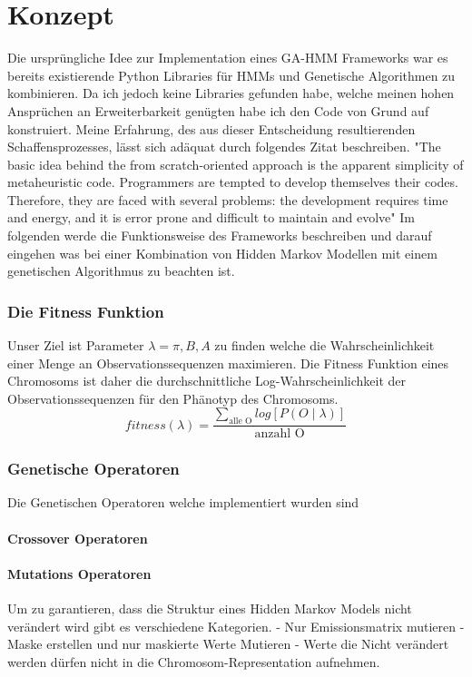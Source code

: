 \chapter{Konzept}
Die ursprüngliche Idee zur Implementation eines GA-HMM Frameworks war es bereits existierende Python Libraries für HMMs und Genetische Algorithmen zu kombinieren. Da ich jedoch keine Libraries gefunden habe, welche meinen hohen Ansprüchen an Erweiterbarkeit genügten habe ich den Code von Grund auf konstruiert. Meine Erfahrung, des aus dieser Entscheidung resultierenden Schaffensprozesses, lässt sich adäquat durch folgendes Zitat beschreiben.
"The basic idea behind the from scratch-oriented approach is the apparent simplicity of metaheuristic code. Programmers are tempted to develop themselves their codes. Therefore, they are faced with several problems: the development requires time and energy, and it is error prone and difficult to maintain and evolve" \cite*{MetaheuristicsEGT}
Im folgenden werde die Funktionsweise des Frameworks beschreiben und darauf eingehen was bei einer Kombination von Hidden Markov Modellen mit einem genetischen Algorithmus zu beachten ist.

\subsection*{Die Fitness Funktion}
Unser Ziel ist Parameter $\lambda = \pi, B, A$ zu finden welche die Wahrscheinlichkeit einer Menge an Observationssequenzen maximieren. Die Fitness Funktion eines Chromosoms ist daher die durchschnittliche Log-Wahrscheinlichkeit der Observationssequenzen für den Phänotyp des Chromosoms.
\begin{equation*}
    fitness(\lambda) = \frac{\sum_{\text{alle O}} log[P(O \mid \lambda)] }{\text{anzahl O}} 
\end{equation*}


\subsection*{Genetische Operatoren}
Die Genetischen Operatoren welche implementiert wurden sind

\subsubsection*{Crossover Operatoren}


\subsubsection*{Mutations Operatoren}
Um zu garantieren, dass die Struktur eines Hidden Markov Models nicht verändert wird gibt es verschiedene Kategorien.
- Nur Emissionsmatrix mutieren
- Maske erstellen und nur maskierte Werte Mutieren
- Werte die Nicht verändert werden dürfen nicht in die Chromosom-Representation aufnehmen.

